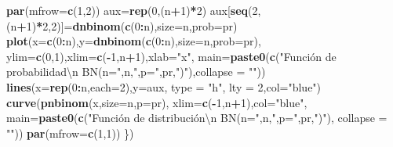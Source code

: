 \documentclass[]{book}
\newenvironment{Shaded}{\begin{snugshade}}{\end{snugshade}}
\newcommand{\CharTok}[1]{\textcolor[rgb]{0.31,0.60,0.02}{#1}}
\newcommand{\DataTypeTok}[1]{\textcolor[rgb]{0.13,0.29,0.53}{#1}}
\newcommand{\DecValTok}[1]{\textcolor[rgb]{0.00,0.00,0.81}{#1}}
\newcommand{\KeywordTok}[1]{\textcolor[rgb]{0.13,0.29,0.53}{\textbf{#1}}}
\newcommand{\NormalTok}[1]{#1}
\newcommand{\OperatorTok}[1]{\textcolor[rgb]{0.81,0.36,0.00}{\textbf{#1}}}
\newcommand{\StringTok}[1]{\textcolor[rgb]{0.31,0.60,0.02}{#1}}
\begin{document}
\begin{Shaded}
\begin{Highlighting}[]
  \KeywordTok{par}\NormalTok{(}\DataTypeTok{mfrow=}\KeywordTok{c}\NormalTok{(}\DecValTok{1}\NormalTok{,}\DecValTok{2}\NormalTok{))}
\NormalTok{  aux=}\KeywordTok{rep}\NormalTok{(}\DecValTok{0}\NormalTok{,(n}\OperatorTok{+}\DecValTok{1}\NormalTok{)}\OperatorTok{*}\DecValTok{2}\NormalTok{)}
\NormalTok{  aux[}\KeywordTok{seq}\NormalTok{(}\DecValTok{2}\NormalTok{,(n}\OperatorTok{+}\DecValTok{1}\NormalTok{)}\OperatorTok{*}\DecValTok{2}\NormalTok{,}\DecValTok{2}\NormalTok{)]=}\KeywordTok{dnbinom}\NormalTok{(}\KeywordTok{c}\NormalTok{(}\DecValTok{0}\OperatorTok{:}\NormalTok{n),}\DataTypeTok{size=}\NormalTok{n,}\DataTypeTok{prob=}\NormalTok{pr)}
  \KeywordTok{plot}\NormalTok{(}\DataTypeTok{x=}\KeywordTok{c}\NormalTok{(}\DecValTok{0}\OperatorTok{:}\NormalTok{n),}\DataTypeTok{y=}\KeywordTok{dnbinom}\NormalTok{(}\KeywordTok{c}\NormalTok{(}\DecValTok{0}\OperatorTok{:}\NormalTok{n),}\DataTypeTok{size=}\NormalTok{n,}\DataTypeTok{prob=}\NormalTok{pr),}
       \DataTypeTok{ylim=}\KeywordTok{c}\NormalTok{(}\DecValTok{0}\NormalTok{,}\DecValTok{1}\NormalTok{),}\DataTypeTok{xlim=}\KeywordTok{c}\NormalTok{(}\OperatorTok{-}\DecValTok{1}\NormalTok{,n}\OperatorTok{+}\DecValTok{1}\NormalTok{),}\DataTypeTok{xlab=}\StringTok{"x"}\NormalTok{,}
       \DataTypeTok{main=}\KeywordTok{paste0}\NormalTok{(}\KeywordTok{c}\NormalTok{(}\StringTok{"Función de probabilidad}\CharTok{\textbackslash{}n}\StringTok{ BN(n="}\NormalTok{,n,}\StringTok{",p="}\NormalTok{,pr,}\StringTok{")"}\NormalTok{),}\DataTypeTok{collapse =} \StringTok{""}\NormalTok{))}
  \KeywordTok{lines}\NormalTok{(}\DataTypeTok{x=}\KeywordTok{rep}\NormalTok{(}\DecValTok{0}\OperatorTok{:}\NormalTok{n,}\DataTypeTok{each=}\DecValTok{2}\NormalTok{),}\DataTypeTok{y=}\NormalTok{aux, }\DataTypeTok{type =} \StringTok{"h"}\NormalTok{, }\DataTypeTok{lty =} \DecValTok{2}\NormalTok{,}\DataTypeTok{col=}\StringTok{"blue"}\NormalTok{)}
  \KeywordTok{curve}\NormalTok{(}\KeywordTok{pnbinom}\NormalTok{(x,}\DataTypeTok{size=}\NormalTok{n,}\DataTypeTok{p=}\NormalTok{pr),}
        \DataTypeTok{xlim=}\KeywordTok{c}\NormalTok{(}\OperatorTok{-}\DecValTok{1}\NormalTok{,n}\OperatorTok{+}\DecValTok{1}\NormalTok{),}\DataTypeTok{col=}\StringTok{"blue"}\NormalTok{,}
        \DataTypeTok{main=}\KeywordTok{paste0}\NormalTok{(}\KeywordTok{c}\NormalTok{(}\StringTok{"Función de distribución\textbackslash{}n BN(n="}\NormalTok{,n,}\StringTok{",p="}\NormalTok{,pr,}\StringTok{")"}\NormalTok{),}
                    \DataTypeTok{collapse =} \StringTok{""}\NormalTok{))}
  \KeywordTok{par}\NormalTok{(}\DataTypeTok{mfrow=}\KeywordTok{c}\NormalTok{(}\DecValTok{1}\NormalTok{,}\DecValTok{1}\NormalTok{))}
\NormalTok{\})}
\end{Highlighting}
\end{Shaded}
\end{document}
